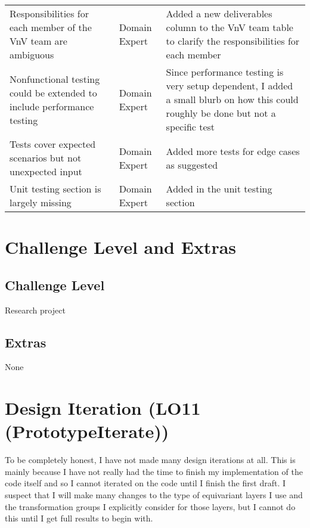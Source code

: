 \documentclass{article}
\begin{document}
\begin{longtable}{p{5cm}p{4cm}p{5cm}}
    Responsibilities for each member of the VnV team are ambiguous & Domain Expert & Added a new deliverables column to the VnV team table to clarify the responsibilities for each member \\
    \addlinespace[0.5cm]

    Nonfunctional testing could be extended to include performance testing & Domain Expert & Since performance testing is very setup dependent, I added a small blurb on how this could roughly be done but not a specific test \\
    \addlinespace[0.5cm]

    Tests cover expected scenarios but not unexpected input & Domain Expert & Added more tests for edge cases as suggested \\
    \addlinespace[0.5cm]

    Unit testing section is largely missing & Domain Expert & Added in the unit testing section \\
    \bottomrule
\end{longtable}

\newpage
\section{Challenge Level and Extras}

\subsection{Challenge Level}

Research project

\subsection{Extras}

None

\section{Design Iteration (LO11 (PrototypeIterate))}

To be completely honest, I have not made many design iterations at all. This is mainly because 
I have not really had the time to finish my implementation of the code itself and so I cannot iterated on 
the code until I finish the first draft. I suspect that I will make many changes to the type of equivariant layers 
I use and the transformation groups I explicitly consider for those layers, but I cannot do this until I get full results to begin with.
\end{document}
